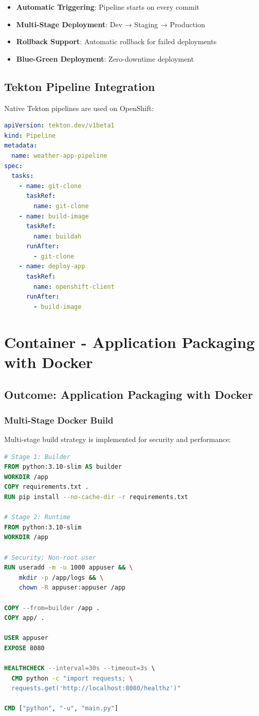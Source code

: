 \documentclass[12pt,a4paper]{article}
\begin{document}
\begin{itemize}
    \item \textbf{Automatic Triggering}: Pipeline starts on every commit
    \item \textbf{Multi-Stage Deployment}: Dev → Staging → Production
    \item \textbf{Rollback Support}: Automatic rollback for failed deployments
    \item \textbf{Blue-Green Deployment}: Zero-downtime deployment
\end{itemize}

\subsection{Tekton Pipeline Integration}

Native Tekton pipelines are used on OpenShift:

\begin{lstlisting}[language=yaml, caption=Tekton Pipeline]
apiVersion: tekton.dev/v1beta1
kind: Pipeline
metadata:
  name: weather-app-pipeline
spec:
  tasks:
    - name: git-clone
      taskRef:
        name: git-clone
    - name: build-image
      taskRef:
        name: buildah
      runAfter:
        - git-clone
    - name: deploy-app
      taskRef:
        name: openshift-client
      runAfter:
        - build-image
\end{lstlisting}

\section{Container - Application Packaging with Docker}

\subsection{Outcome: Application Packaging with Docker}

\subsubsection{Multi-Stage Docker Build}

Multi-stage build strategy is implemented for security and performance:

\begin{lstlisting}[language=dockerfile, caption=Multi-Stage Dockerfile]
# Stage 1: Builder
FROM python:3.10-slim AS builder
WORKDIR /app
COPY requirements.txt .
RUN pip install --no-cache-dir -r requirements.txt

# Stage 2: Runtime
FROM python:3.10-slim
WORKDIR /app

# Security: Non-root user
RUN useradd -m -u 1000 appuser && \
    mkdir -p /app/logs && \
    chown -R appuser:appuser /app

COPY --from=builder /app .
COPY app/ .

USER appuser
EXPOSE 8080

HEALTHCHECK --interval=30s --timeout=3s \
  CMD python -c "import requests; \
  requests.get('http://localhost:8080/healthz')"

CMD ["python", "-u", "main.py"]
\end{lstlisting}
\end{document}
